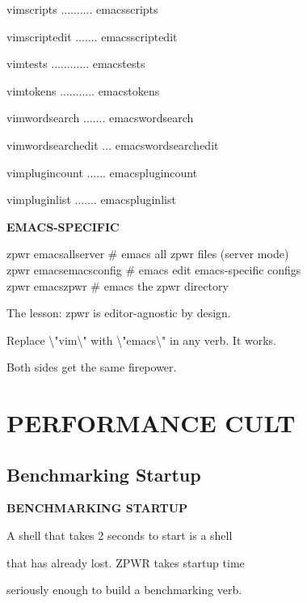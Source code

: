 \documentclass[11pt,a4paper,twoside]{book}
\begin{document}
vimscripts .......... emacsscripts

vimscriptedit ....... emacsscriptedit

vimtests ............ emacstests

vimtokens ........... emacstokens

vimwordsearch ....... emacswordsearch

vimwordsearchedit ... emacswordsearchedit

vimplugincount ...... emacsplugincount

vimpluginlist ....... emacspluginlist


\vspace{12pt}
{\bfseries\color{neonyellow} EMACS-SPECIFIC}\vspace{4pt}

\begin{codebox}
zpwr emacsallserver       \# emacs all zpwr files (server mode)\\
zpwr emacsemacsconfig     \# emacs edit emacs-specific configs\\
zpwr emacszpwr            \# emacs the zpwr directory\\
\end{codebox}

The lesson: zpwr is editor-agnostic by design.

Replace \textbackslash{}"vim\textbackslash{}" with \textbackslash{}"emacs\textbackslash{}" in any verb. It works.

Both sides get the same firepower.


\vspace{16pt}


\chapter{PERFORMANCE CULT}

\section{Benchmarking Startup}


\vspace{10pt}
{\large\bfseries\color{neoncyan} BENCHMARKING STARTUP}\vspace{6pt}

A shell that takes 2 seconds to start is a shell

that has already lost. ZPWR takes startup time

seriously enough to build a benchmarking verb.
\end{document}
